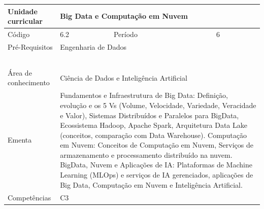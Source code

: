 \clearpage
\newpage

\begin{quadro}[ht!]
  \centering\scriptsize
\caption{Unidade Curricular Big Data e Computação em Nuvem}

\begin{tabular}{|p{2.5cm}|p{2.5cm}|p{2.5cm}|p{2.5cm}|p{2.5cm}|}\hline

  Unidade curricular & \multicolumn{4}{p{10cm}|}{ Big Data e Computação em Nuvem }\\\hline
  Código & 6.2 & Período & \multicolumn{2}{p{5cm}|}{ 6 }\\\hline
  Pré-Requisitos & \multicolumn{4}{p{10cm}|}{ Engenharia de Dados } \\\hline
  \cellcolor{blue1}{ CH PRESENCIAL } &
    \cellcolor{blue1}{CH EAD Síncrona} &
    \cellcolor{blue1}{CH EAD Síncrona Mediada} &
    \cellcolor{blue1}{CH EAD Assíncrona} &
    \cellcolor{blue1}{CH APCC} \\\hline
  \cellcolor{blue1}{ 30 } &
    \cellcolor{blue1}{ 0 } &
    \cellcolor{blue1}{ 0 } &
    \cellcolor{blue1}{ 30 } &
    \cellcolor{blue1}{0} \\\hline
  \cellcolor{blue1}{ CH Teórica } &
    \cellcolor{blue1}{CH Prática} &
    \cellcolor{blue1}{CH Humanidades} &
    \cellcolor{blue1}{CH Extensão} &
    \cellcolor{blue1}{CH EAD TOTAL} \\\hline
  \cellcolor{blue1}{ 30 } &
    \cellcolor{blue1}{ 30 } &
    \cellcolor{blue1}{ 0 } &
    \cellcolor{blue1}{ 0 } &
    \cellcolor{blue1}{ 30 } \\\hline
  \cellcolor{blue1}{CARGA-HORÁRIA TOTAL} & \multicolumn{4}{p{10cm}|}{ \cellcolor{blue1}{ 60 } } \\\hline
  Área de conhecimento & \multicolumn{4}{p{10cm}|}{ Ciência de Dados e Inteligência Artificial } \\\hline
  Ementa & \multicolumn{4}{p{10cm}|}{ Fundamentos e Infraestrutura de Big Data: Definição, evolução e os 5 Vs (Volume, Velocidade, Variedade, Veracidade e Valor), Sistemas Distribuídos e Paralelos para BigData, Ecossistema Hadoop, Apache Spark, Arquitetura Data Lake (conceitos, comparação com Data Warehouse). Computação em Nuvem: Conceitos de Computação em Nuvem, Serviços de armazenamento e processamento distribuído na nuvem. BigData, Nuvem e Aplicações de IA: Plataformas de Machine Learning (MLOps) e serviços de IA gerenciados, aplicações de Big Data, Computação em Nuvem e Inteligência Artificial. } \\\hline
  Competências & \multicolumn{4}{p{10cm}|}{ C3 } \\\hline


  
	\end{tabular}

\end{quadro}


